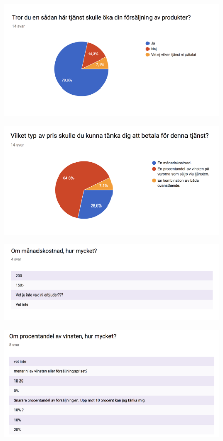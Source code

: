 \documentclass[10pt,a4paper,oneside]{article}
\begin{document}
\begin{figure}
	\includegraphics[scale=0.6]{10.png}
\end{figure}

\begin{figure}
	\includegraphics[scale=0.6]{11.png}
\end{figure}

\begin{figure}
	\includegraphics[scale=0.6]{12.png}
\end{figure}

\begin{figure}
	\includegraphics[scale=0.6]{13.png}
\end{figure}
\end{document}
